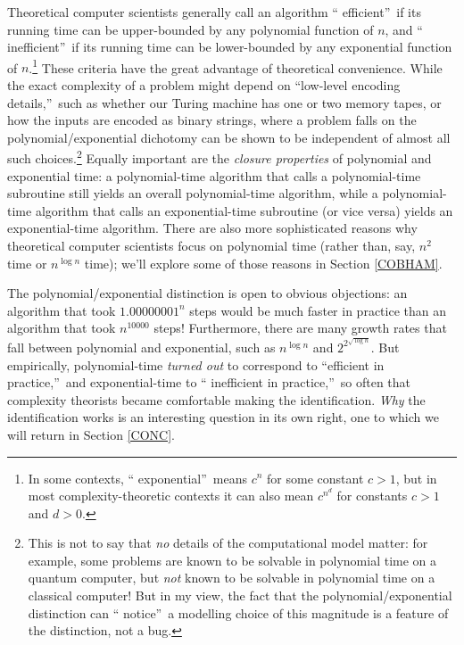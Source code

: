 \documentclass[12pt,onecolumn]{article}%
\begin{document}
Theoretical computer scientists generally call an algorithm \textquotedblleft
efficient\textquotedblright\  if its running time can be upper-bounded by any
polynomial function of $n$, and \textquotedblleft
inefficient\textquotedblright\  if its running time can be lower-bounded by any
exponential function of $n$.\footnote{In some contexts, \textquotedblleft
exponential\textquotedblright\  means $c^{n}$ for some constant $c>1$, but in
most complexity-theoretic contexts it can also mean $c^{n^{d}}$ for constants
$c>1$ and $d>0$.} These criteria have the great advantage of theoretical
convenience. While the exact complexity of a problem might depend on
\textquotedblleft low-level encoding details,\textquotedblright\  such as
whether our Turing machine has one or two memory tapes, or how the inputs are
encoded as binary strings, where a problem falls on the polynomial/exponential
dichotomy can be shown to be independent of almost all such
choices.\footnote{This is not to say that \textit{no} details of the
computational model matter: for example, some problems are known to be
solvable in polynomial time on a quantum computer, but \textit{not} known to
be solvable in polynomial time on a classical computer! But in my view, the
fact that the polynomial/exponential distinction can \textquotedblleft
notice\textquotedblright\  a modelling choice of this magnitude is a feature of
the distinction, not a bug.} Equally important are the \textit{closure
properties} of polynomial and exponential time: a polynomial-time algorithm
that calls a polynomial-time subroutine still yields an overall
polynomial-time algorithm, while a polynomial-time algorithm that calls an
exponential-time subroutine (or vice versa) yields an exponential-time
algorithm. There are also more sophisticated reasons why theoretical
computer scientists focus on polynomial time (rather than, say, $n^{2}$ time
or $n^{\log n}$ time); we'll explore some of those reasons in Section
\ref{COBHAM}.

The polynomial/exponential distinction is open to obvious objections: an
algorithm that took $1.00000001^{n}$ steps would be much faster in practice
than an algorithm that took $n^{10000}$ steps! Furthermore, there are many
growth rates that fall between polynomial and exponential, such as $n^{\log
n}$ and $2^{2^{\sqrt{\log n}}}$. But empirically, polynomial-time
\textit{turned out} to correspond to \textquotedblleft efficient in
practice,\textquotedblright\  and exponential-time to \textquotedblleft
inefficient in practice,\textquotedblright\  so often that complexity theorists
became comfortable making the identification. \textit{Why} the
identification works is an interesting question in its own right, one to which
we will return in Section \ref{CONC}.
\end{document}
